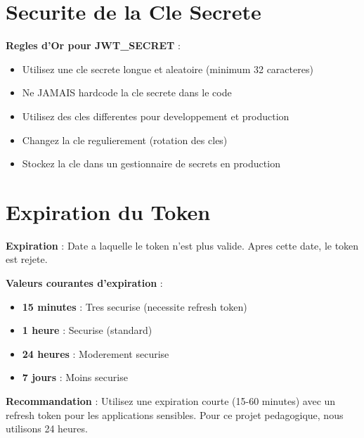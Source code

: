\documentclass[a4paper,12pt]{book}
\begin{document}
\section{Securite de la Cle Secrete}

\begin{securitybox}
    \textbf{Regles d'Or pour JWT\_SECRET} :
    \begin{itemize}
        \item Utilisez une cle secrete longue et aleatoire (minimum 32 caracteres)
        \item Ne JAMAIS hardcode la cle secrete dans le code
        \item Utilisez des cles differentes pour developpement et production
        \item Changez la cle regulierement (rotation des cles)
        \item Stockez la cle dans un gestionnaire de secrets en production
    \end{itemize}
\end{securitybox}


\section{Expiration du Token}

\begin{definitionbox}
    \textbf{Expiration} : Date a laquelle le token n'est plus valide. Apres cette date, le token est rejete.
\end{definitionbox}

\textbf{Valeurs courantes d'expiration} :
\begin{itemize}
    \item \textbf{15 minutes} : Tres securise (necessite refresh token)
    \item \textbf{1 heure} : Securise (standard)
    \item \textbf{24 heures} : Moderement securise
    \item \textbf{7 jours} : Moins securise
\end{itemize}

\begin{bestpracticebox}
    \textbf{Recommandation} : Utilisez une expiration courte (15-60 minutes) avec un refresh token pour les applications sensibles. Pour ce projet pedagogique, nous utilisons 24 heures.
\end{bestpracticebox}
\end{document}

